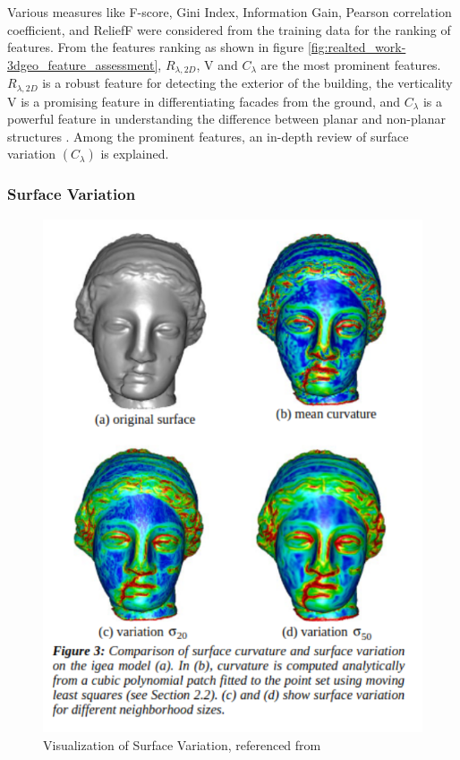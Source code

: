 Various measures like F-score, Gini Index, Information Gain, Pearson correlation coefficient, and ReliefF were considered from the training data for the ranking of features. From the features ranking as shown in figure \ref{fig:realted_work-3dgeo_feature_assessment}, \( R_{\lambda,2D} \), V and \(C_{\lambda} \) are the most prominent features. \( R_{\lambda,2D} \) is a robust feature for detecting the exterior of the building, the verticality V is a promising feature in differentiating facades from the ground, and \(C_{\lambda} \) is a powerful feature in understanding the difference between planar and non-planar structures \parencite{weinmann2013feature}. Among the prominent features, an in-depth review of surface variation \((C_{\lambda}) \) is explained.

\subsubsection{Surface Variation}

\begin{figure}[htbp]
    \centering
    \includegraphics[width=0.6\linewidth]{97_graphics/related_work/surf_variation_with_description.pdf}
    \caption{Visualization of Surface Variation, referenced from \parencite{pauly2002efficient}}
    \label{fig:related_work-surface_variation_visualize}
\end{figure}

